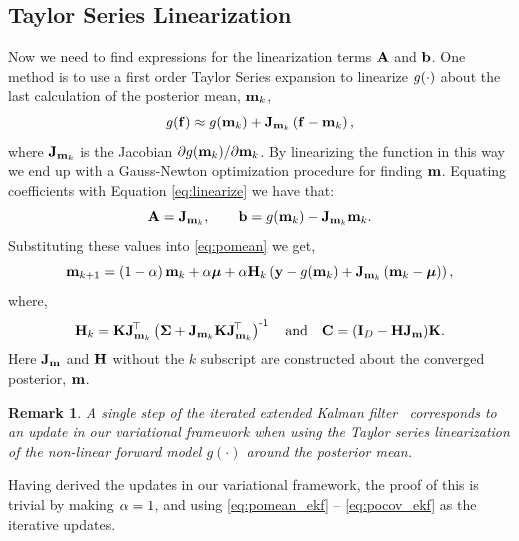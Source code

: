 \documentclass{article} %
\newtheorem{remark}{Remark}
\begin{document}
\subsection{Taylor Series Linearization}

Now we need to find expressions for the linearization terms $\mathbf{A}$ and
$\mathbf{b}$. One method is to use a first order Taylor Series expansion to 
linearize $g\!\left({{\cdot}}\right)$ about the last calculation of the posterior mean, 
$\mathbf{m}_k$,
\begin{equation}
    g\!\left({{\mathbf{f}}}\right) \approx g\!\left({{\mathbf{m}_k}}\right) +
    \mathbf{J}_{\mathbf{m}_k}\left({\mathbf{f} - \mathbf{m}_k}\right),
\end{equation}
where $\mathbf{J}_{\mathbf{m}_k}$ is the Jacobian $\partial g\!\left({{\mathbf{m}_k}}\right)\!/
\partial\mathbf{m}_k$. By linearizing the function in this way we end up with a
Gauss-Newton optimization procedure for finding $\mathbf{m}$.  Equating
coefficients with Equation \eqref{eq:linearize} we have that:
\begin{equation}
    \mathbf{A} = \mathbf{J}_{\mathbf{m}_k}, \qquad \mathbf{b} = g\!\left({{\mathbf{m}_k}}\right) -
    \mathbf{J}_{\mathbf{m}_k}\mathbf{m}_k.
\end{equation}
Substituting these values into \eqref{eq:pomean} we get,
\begin{equation}
    \mathbf{m}_{k+1} = \left({1-\alpha}\right)\mathbf{m}_k + \alpha\boldsymbol{\mu} 
        + \alpha\mathbf{H}_k\left({\mathbf{y} - g\!\left({{\mathbf{m}_k}}\right) 
        + \mathbf{J}_{\mathbf{m}_k}\left({\mathbf{m}_k - \boldsymbol{\mu}}\right)}\right),
    \label{eq:pomean_ekf}
\end{equation}
where,
\begin{equation}
    \mathbf{H}_k = \mathbf{K}\mathbf{J}_{\mathbf{m}_k}^{\!\top}\left({\boldsymbol{\Sigma} +
        \mathbf{J}_{\mathbf{m}_k}\mathbf{K}\mathbf{J}_{\mathbf{m}_k}^{\!\top}}\right)^{\text{-}1}
    \quad\text{and}\quad
    \mathbf{C} = \left({\mathbf{I}_{D} - \mathbf{H}\mathbf{J}_{\mathbf{m}}}\right)\!\mathbf{K}.
    \label{eq:pocov_ekf}
\end{equation}
Here $\mathbf{J}_{\mathbf{m}}$ and $\mathbf{H}$ without the $k$ subscript are constructed
about the converged posterior, $\mathbf{m}$. 
%
\begin{remark}
A single step of the  iterated extended Kalman filter~\cite{Bell1993,
    Sibley2006} corresponds to an update  in our variational framework when
using the Taylor series linearization of the non-linear forward model
$g(\cdot)$ around the posterior mean.
\end{remark}
Having derived the updates in our variational framework, the proof of this is
trivial by making  $\alpha =1$, and using \eqref{eq:pomean_ekf} --
\eqref{eq:pocov_ekf} as the iterative updates.
%
\end{document}
